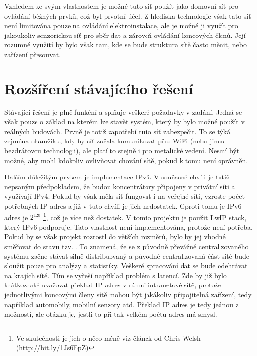 Vzhledem ke svým vlastnostem je možné tuto síť použít jako domovní síť pro ovládání běžných prvků, což byl prvotní účel. Z hlediska technologie však tato síť není limitována pouze na ovládání elektroinstalace, ale je možné ji využít pro jakoukoliv senzorickou síť pro sběr dat a zároveň ovládání koncových členů. Její rozumné využití by bylo však tam, kde se bude struktura sítě často měnit, nebo zařízení přesouvat.

\chapter{Rozšíření stávajícího řešení}
Stávající řešení je plně funkční a splňuje veškeré požadavky v zadání. Jedná se však pouze o základ na kterém lze stavět systém, který by bylo možné použít v reálných budovách. Prvně je totiž zapotřebí tuto síť zabezpečit. To se týká zejména okamžiku, kdy by síť začala komunikovat přes WiFi (nebo jinou bezdrátovou technologii), ale platí to stejně i pro metalické vedení. Nesmí být možné, aby mohl kdokoliv ovlivňovat chování sítě, pokud k tomu není oprávněn.

Dalším důležitým prvkem je implementace IPv6. V současné chvíli je totiž nepsaným předpokladem, že budou koncentrátory připojeny v privátní síti a využívají IPv4. Pokud by však měla síť fungovat i na veřejné síti, vzroste počet potřebných IP adres a již v tuto chvíli je jich nedostatek. Oproti tomu je IPv6 adres je $2^{128}$ \cite{ripe}\footnote{Ve skutečnosti je jich o něco méně viz článek od Chris Welsh  (\url{http://bit.ly/1Js6EpZ)}}, což je více než dostatek. V tomto projektu je použit LwIP stack, který IPv6 podporuje. Tato vlastnost není implementována, protože není potřeba. Pokud by se však projekt rozrostl do větších rozměrů, bylo by jej vhodné směřovat do stavu tzv. . To znamená, že se z původně převážně centralizovaného systému začne stávat silně distribuovaný a původně centralizovaná část sítě bude sloužit pouze pro analýzy a statistiky. Veškeré zpracování dat se bude odehrávat na krajích sítě. Tím se vyřeší například problém s latencí. Zde by již bylo krátkozraké uvažovat překlad IP adres v rámci intranetové sítě, protože jednotlivými koncovými členy sítě mohou být jakákoliv připojitelná zařízení, tedy například automobily, mobilní senzory atd. Překlad IP adres je tedy jednou z možností, ale otázku je, jestli to při tak velkém počtu adres má smysl.


